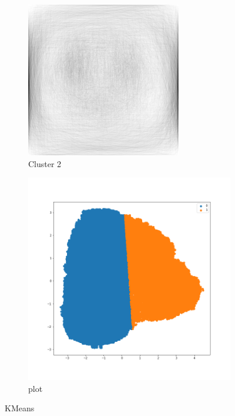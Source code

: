 \documentclass[a4paper, twocolumn]{article}
\begin{document}
\begin{figure}[H]
\begin{subfigure}{.33\columnwidth}
            \includegraphics[width=.9\textwidth]{figures/kmeans-cluster1.png}
            \caption{Cluster 2}
            \label{fig:kmeans-cluster1}
        \end{subfigure}%
        \begin{subfigure}{.33\columnwidth}
            \centering
            \includegraphics[width=.9\textwidth]{figures/kmeans-plot.png}
            \caption{plot}
            \label{fig:kmeans-plot}
        \end{subfigure}
        \caption{KMeans}
        \label{fig:clustering}
    \end{figure}
\end{document}
